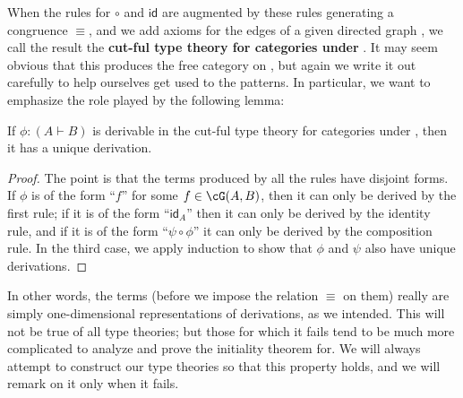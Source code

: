 \documentclass{book}
\def\idfunc{\mathsf{id}}
\let\types\vdash
\begin{document}
When the rules for $\circ$ and $\idfunc$ are augmented by these rules generating a congruence $\equiv$, and we add axioms for the edges of a given directed graph \cG, we call the result the \textbf{cut-ful type theory for categories under \cG}.
It may seem obvious that this produces the free category on \cG, but again we write it out carefully to help ourselves get used to the patterns.
In particular, we want to emphasize the role played by the following lemma:

\begin{lem}\label{thm:category-uniqderiv}
  If $\phi :(A\types B)$ is derivable in the cut-ful type theory for categories under \cG, then it has a unique derivation.
\end{lem}
\begin{proof}
  The point is that the terms produced by all the rules have disjoint forms.
  If $\phi$ is of the form ``$f$'' for some $f\in\cG(A,B)$, then it can only be derived by the first rule; if it is of the form ``$\idfunc_A$'' then it can only be derived by the identity rule, and if it is of the form ``$\psi\circ\phi$'' it can only be derived by the composition rule.
  In the third case, we apply induction to show that $\phi$ and $\psi$ also have unique derivations.
\end{proof}

In other words, the terms (before we impose the relation $\equiv$ on them) really are simply one-dimensional representations of derivations, as we intended.
This will not be true of all type theories; but those for which it fails tend to be much more complicated to analyze and prove the initiality theorem for.
We will always attempt to construct our type theories so that this property holds, and we will remark on it only when it fails.
\end{document}
